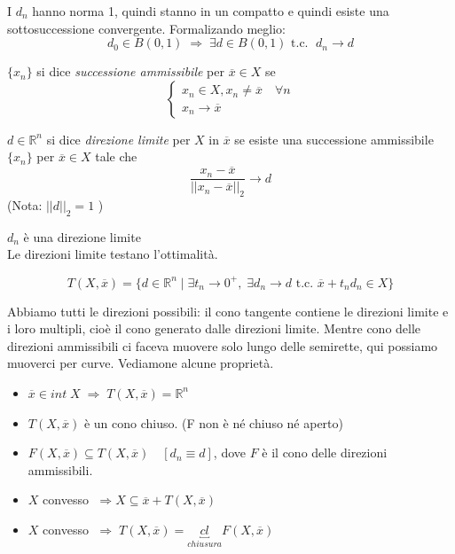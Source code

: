 \begin{observation}
I $d_n$ hanno norma 1, quindi stanno in un compatto e quindi
 esiste una sottosuccessione convergente.  Formalizando meglio:
$$ d_0 \in B(0,1) \; \Rightarrow \; \exists d \in B(0,1) \text{ t.c. }
\; d_n \to d$$
\end{observation}
\begin{defn}
$\{x_n \}$ si dice \emph{successione ammissibile} per $\overline{x} \in X$
se
$$
\left\{
\begin{array}{l}
x_n \in X, x_n \neq \overline{x} \quad \forall n \\
x_n \to \overline{x}
\end{array}
\right.
$$
\end{defn}

\begin{defn}
$d \in \mathbb{R}^{n}$ si dice \emph{direzione limite} per $X$ in
$\overline{x}$ se esiste una successione ammissibile $\{x_n \}$ 
per $\overline{x} \in X$ tale che
$$
\dfrac{x_n - \overline{x}}{||x_n - \overline{x}||_2 }\to d
$$
(Nota: $||d||_2 = 1$ )
\end{defn}

$d_n$ \`e una direzione limite \\
Le direzioni limite testano l'ottimalit\`a. \\
\begin{defn}
$$ T(X, \overline{x}) = \{ d \in \mathbb{R}^{n} \; | \; \exists
t_n \rightarrow 0^{+}, \; \exists d_n \rightarrow d \text{ t.c. }
\overline{x} + t_nd_n \in X \}
$$
\end{defn}
Abbiamo tutti le direzioni possibili: il cono tangente contiene
le direzioni limite e i loro multipli, cio\`e il cono generato
dalle direzioni limite.
Mentre cono delle direzioni ammissibili ci faceva muovere
solo lungo delle semirette, qui possiamo muoverci per curve.
 Vediamone alcune propriet\`a.
\begin{property}
\begin{itemize}
\item $\overline{x} \in int\; X \; \Rightarrow \; T(X, \overline{x}) = \mathbb{R}^{n}$
\item $T(X, \overline{x})$ \`e un cono chiuso.
  (F non \`e n\'e chiuso n\'e aperto)
\item $F(X, \overline{x}) \subseteq T(X, \overline{x}) \quad
 [d_n \equiv d ]$, dove $F$ \`e il cono delle direzioni ammissibili.
\item $X$ convesso $ \; \Rightarrow X \subseteq \overline{x} + T(X, \overline{x})$
\item $X$ convesso
  $ \; \Rightarrow \; T(X, \overline{x}) = \underbracket{cl}_{chiusura}F(X, \overline{x})$
\end{itemize}
\end{property}

